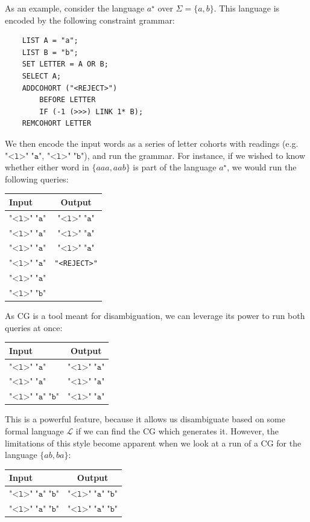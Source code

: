 \documentclass[11pt]{article}
\def\t#1{\texttt{#1}}
\begin{document}
As an example, consider the language $a^\star$ over $\Sigma = \{a,b\}$.
This language is encoded by the following constraint grammar:
\begin{center}
  \begin{Verbatim}
    LIST A = "a";
    LIST B = "b";
    SET LETTER = A OR B;
    SELECT A;
    ADDCOHORT ("<REJECT>")
        BEFORE LETTER 
        IF (-1 (>>>) LINK 1* B);
    REMCOHORT LETTER
  \end{Verbatim}
\end{center}
We then encode the input words as a series of letter cohorts with readings
(e.g.\ \(\t{"<l>"}\;\t{"a"}\), \(\t{"<l>"}\;\t{"b"}\)), and run the grammar.
For instance, if we wished to know whether either word in $\{aaa,aab\}$ is part
of the language $a^\star$, we would run the following queries:
\begin{center}
  \begin{tabular}{l|c}
    \textbf{Input}         & \textbf{Output} \\ \hline
    \(\t{"<l>"}\;\t{"a"}\) & \(\t{"<l>"}\;\t{"a"}\) \\
    \(\t{"<l>"}\;\t{"a"}\) & \(\t{"<l>"}\;\t{"a"}\) \\
    \(\t{"<l>"}\;\t{"a"}\) & \(\t{"<l>"}\;\t{"a"}\) \\ \hline
    \(\t{"<l>"}\;\t{"a"}\) & \t{"<REJECT>"} \\
    \(\t{"<l>"}\;\t{"a"}\) \\
    \(\t{"<l>"}\;\t{"b"}\)
  \end{tabular}
\end{center}
As CG is a tool meant for disambiguation, we can leverage its power to run both
queries at once:
\begin{center}
  \begin{tabular}{l|c}
    \textbf{Input}                  & \textbf{Output} \\ \hline
    \(\t{"<l>"}\;\t{"a"}\)          & \(\t{"<l>"}\;\t{"a"}\) \\
    \(\t{"<l>"}\;\t{"a"}\)          & \(\t{"<l>"}\;\t{"a"}\) \\
    \(\t{"<l>"}\;\t{"a"}\;\t{"b"}\) & \(\t{"<l>"}\;\t{"a"}\)
  \end{tabular}
\end{center}
This is a powerful feature, because it allows us disambiguate based on some
formal language $\mathcal{L}$ if we can find the CG which generates it.
However, the limitations of this style become apparent when we look at a run of
a CG for the language $\{ab,ba\}$:
\begin{center}
  \begin{tabular}{l|c}
    \textbf{Input}                  & \textbf{Output} \\ \hline
    \(\t{"<l>"}\;\t{"a"}\;\t{"b"}\) & \(\t{"<l>"}\;\t{"a"}\;\t{"b"}\) \\
    \(\t{"<l>"}\;\t{"a"}\;\t{"b"}\) & \(\t{"<l>"}\;\t{"a"}\;\t{"b"}\) \\
  \end{tabular}
\end{center}
\end{document}
